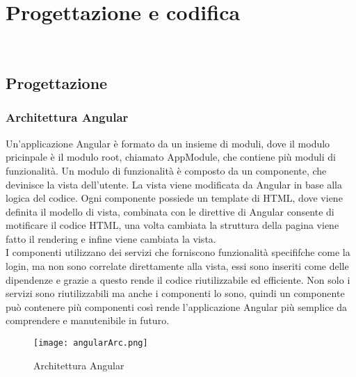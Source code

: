 
\chapter{Progettazione e codifica}
\label{cap:progettazione e codifica}

\\

\section{Progettazione}
\subsection{Architettura Angular}
Un'applicazione Angular è formato da un insieme di moduli, dove il modulo pricinpale è il modulo root, chiamato AppModule, che contiene più moduli di funzionalità. Un modulo di funzionalità è composto da un componente, che devinisce la vista dell'utente.
La vista viene modificata da Angular in base alla logica del codice. Ogni componente possiede un template di HTML, dove viene definita il modello di vista, combinata con le direttive di Angular consente di motificare il codice HTML, una volta cambiata la struttura della pagina viene fatto il rendering\gl{} e infine viene cambiata la vista.\\ 
I componenti utilizzano dei servizi che forniscono funzionalità specififche come la login, ma non sono correlate direttamente alla vista, essi sono inseriti come delle dipendenze e grazie a questo rende il codice riutilizzabile ed efficiente. Non solo i servizi sono riutilizzabili ma anche i componenti lo sono, quindi un componente può contenere più componenti così rende l'applicazione Angular più semplice da comprendere e manutenibile in futuro.\\
\begin{figure}[H]
    \centering
    \texttt{[image: angularArc.png]}
    \caption{Architettura Angular}
\end{figure}
